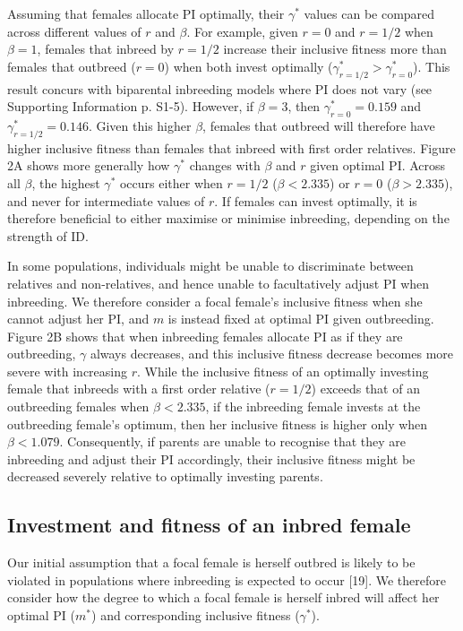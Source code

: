 \documentclass[12pt]{article}
\begin{document}
Assuming that females allocate PI optimally, their $\gamma^{*}$ values can be compared across different values of $r$ and $\beta$. For example, given $r=0$ and $r=1/2$ when $\beta=1$, females that inbreed by $r=1/2$ increase their inclusive fitness more than females that outbreed ($r=0$) when both invest optimally ($\gamma^{*}_{r=1/2}>\gamma^{*}_{r=0}$). This result concurs with biparental inbreeding models where PI does not vary (see Supporting Information p. S1-5). However, if $\beta=3$, then $\gamma^{*}_{r=0}=0.159$ and $\gamma^{*}_{r=1/2}=0.146$. Given this higher $\beta$, females that outbreed will therefore have higher inclusive fitness than females that inbreed with first order relatives. Figure 2A shows more generally how $\gamma^{*}$ changes with $\beta$ and $r$ given optimal PI. Across all $\beta$, the highest $\gamma^{*}$ occurs either when $r=1/2$ ($\beta < 2.335$) or $r=0$ ($\beta > 2.335$), and never for intermediate values of $r$. If females can invest optimally, it is therefore beneficial to either maximise or minimise inbreeding, depending on the strength of ID.

In some populations, individuals might be unable to discriminate between relatives and non-relatives, and hence unable to facultatively adjust PI when inbreeding. We therefore consider a focal female's inclusive fitness when she cannot adjust her PI, and $m$ is instead fixed at optimal PI given outbreeding. Figure 2B shows that when inbreeding females allocate PI as if they are outbreeding, $\gamma$ always decreases, and this inclusive fitness decrease becomes more severe with increasing $r$. While the inclusive fitness of an optimally investing female that inbreeds with a first order relative ($r=1/2$) exceeds that of an outbreeding females when $\beta < 2.335$, if the inbreeding female invests at the outbreeding female's optimum, then her inclusive fitness is higher only when $\beta < 1.079$. Consequently, if parents are unable to recognise that they are inbreeding and adjust their PI accordingly, their inclusive fitness might be decreased severely relative to optimally investing parents.


\subsection*{Investment and fitness of an inbred female}

Our initial assumption that a focal female is herself outbred is likely to be violated in populations where inbreeding is expected to occur [19]. We therefore consider how the degree to which a focal female is herself inbred will affect her optimal PI ($m^{*}$) and corresponding inclusive fitness ($\gamma^{*}$).
\end{document}
